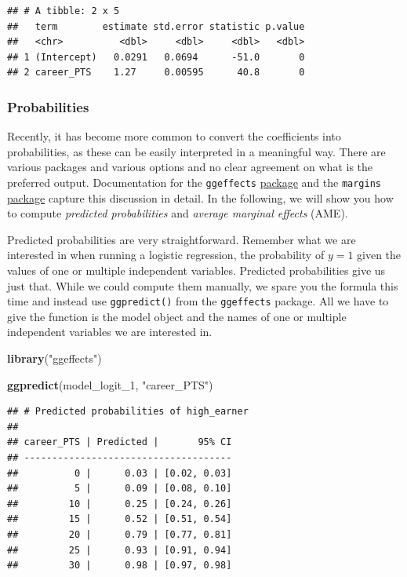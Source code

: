 \documentclass[
]{book}
\newenvironment{Shaded}{\begin{snugshade}}{\end{snugshade}}
\newcommand{\FunctionTok}[1]{\textcolor[rgb]{0.13,0.29,0.53}{\textbf{#1}}}
\newcommand{\NormalTok}[1]{#1}
\newcommand{\StringTok}[1]{\textcolor[rgb]{0.31,0.60,0.02}{#1}}
\begin{document}
\begin{verbatim}
## # A tibble: 2 x 5
##   term        estimate std.error statistic p.value
##   <chr>          <dbl>     <dbl>     <dbl>   <dbl>
## 1 (Intercept)   0.0291   0.0694      -51.0       0
## 2 career_PTS    1.27     0.00595      40.8       0
\end{verbatim}

\hypertarget{probabilities}{%
\subsubsection{Probabilities}\label{probabilities}}

Recently, it has become more common to convert the coefficients into
probabilities, as these can be easily interpreted in a meaningful way.
There are various packages and various options and
no clear agreement on what is the preferred output. Documentation for
the \texttt{ggeffects}
\href{https://strengejacke.github.io/ggeffects/index.html}{package} and the
\texttt{margins} \href{https://thomasleeper.com/margins/}{package} capture this
discussion in detail. In the following, we will show you how to compute
\emph{predicted probabilities} and \emph{average marginal effects} (AME).

Predicted probabilities are very straightforward. Remember what we are
interested in when running a logistic regression, the probability of
\(y = 1\) given the values of one or multiple independent variables.
Predicted probabilities give us just that. While we could compute them
manually, we spare you the formula this time and instead use
\texttt{ggpredict()} from the \texttt{ggeffects} package. All we have to give the
function is the model object and the names of one or multiple
independent variables we are interested in.

\begin{Shaded}
\begin{Highlighting}[]
\FunctionTok{library}\NormalTok{(}\StringTok{"ggeffects"}\NormalTok{)}

\FunctionTok{ggpredict}\NormalTok{(model\_logit\_1, }\StringTok{"career\_PTS"}\NormalTok{)}
\end{Highlighting}
\end{Shaded}

\begin{verbatim}
## # Predicted probabilities of high_earner
## 
## career_PTS | Predicted |       95% CI
## -------------------------------------
##          0 |      0.03 | [0.02, 0.03]
##          5 |      0.09 | [0.08, 0.10]
##         10 |      0.25 | [0.24, 0.26]
##         15 |      0.52 | [0.51, 0.54]
##         20 |      0.79 | [0.77, 0.81]
##         25 |      0.93 | [0.91, 0.94]
##         30 |      0.98 | [0.97, 0.98]
\end{verbatim}
\end{document}
